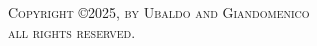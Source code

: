 \newpage
\thispagestyle{empty}
\addtocounter{page}{-1}
\vspace*{\fill}
\scshape \noindent Copyright \copyright 2025, by Ubaldo and Giandomenico \\
\noindent all rights reserved.
\vspace*{\fill}
\newpage
\rm